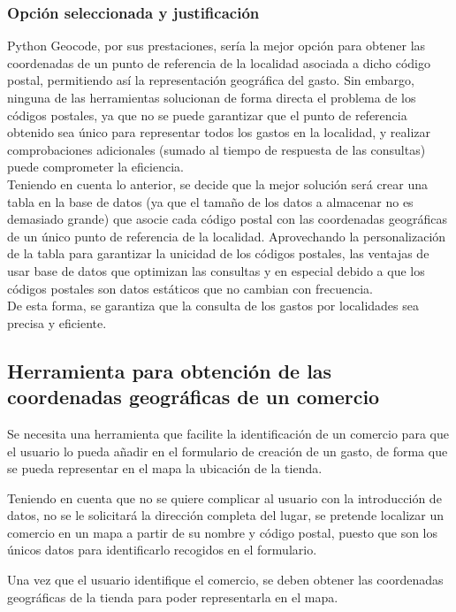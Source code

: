 \subsubsection{Opción seleccionada y justificación}\label{sec:justificacion_pgeocode}
Python Geocode, por sus prestaciones, sería la mejor opción para obtener las coordenadas de un punto de referencia de la localidad asociada a dicho código postal, permitiendo así la representación geográfica del gasto. Sin embargo, ninguna de las herramientas solucionan de forma directa el problema de los códigos postales, ya que no se puede garantizar que el punto de referencia obtenido sea único para representar todos los gastos en la localidad, y realizar comprobaciones adicionales (sumado al tiempo de respuesta de las consultas) puede comprometer la eficiencia.\\
Teniendo en cuenta lo anterior, se decide que la mejor solución será crear una tabla en la base de datos (ya que el tamaño de los datos a almacenar no es demasiado grande) que asocie cada código postal con las coordenadas geográficas de un único punto de referencia de la localidad. Aprovechando la personalización de la tabla para garantizar la unicidad de los códigos postales, las ventajas de usar base de datos que optimizan las consultas y en especial debido a que los códigos postales son datos estáticos que no cambian con frecuencia.\\
De esta forma, se garantiza que la consulta de los gastos por localidades sea precisa y eficiente.


\subsection{Herramienta para obtención de las coordenadas geográficas de un comercio}
Se necesita una herramienta que facilite la identificación de un comercio para que el usuario lo pueda añadir en el formulario de creación de un gasto, de forma que se pueda representar en el mapa la ubicación de la tienda.

Teniendo en cuenta que no se quiere complicar al usuario con la introducción de datos, no se le solicitará la dirección completa del lugar, se pretende localizar un comercio en un mapa a partir de su nombre y código postal, puesto que son los únicos datos para identificarlo recogidos en el formulario.

Una vez que el usuario identifique el comercio, se deben obtener las coordenadas geográficas de la tienda para poder representarla en el mapa.\\


